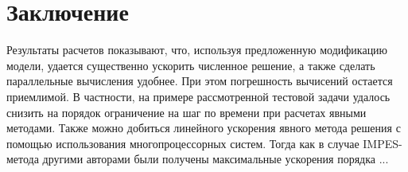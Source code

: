\section{Заключение}
Результаты расчетов показывают, что, используя предложенную модификацию модели, удается существенно ускорить
численное решение, а также сделать параллельные вычисления удобнее. При этом погрешность вычисений остается
приемлимой. В частности, на примере рассмотренной тестовой задачи удалось снизить на порядок ограничение на шаг по времени
при расчетах явными методами.
Также можно добиться линейного ускорения явного метода решения с помощью использования многопроцессорных систем. 
Тогда как в случае IMPES-метода другими авторами были получены максимальные ускорения порядка ...
